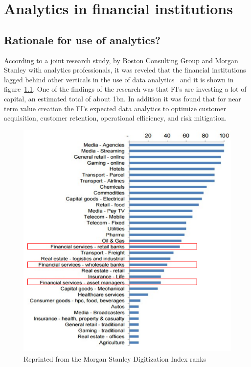 \setlength{\footskip}{8mm}

\chapter{Analytics in financial institutions}

\section{Rationale for use of analytics?}
According to a joint research study, by Boston Consulting Group and Morgan Stanley with analytics professionals, it was reveled that the financial institutions lagged behind other verticals in the use of data analytics~ and it is shown in figure~\ref{fig:da_digitization}. One of the findings of the research was that FI's are investing a lot of capital, an estimated total of about \textdollar1bn. In addition it was found that for near term value creation the FI's expected data analytics to optimize customer acquisition, customer retention, operational efficiency, and risk mitigation.
\newline
\newline
\begin{figure}[H]
	\includegraphics[width=13cm, height=12cm]{figures/DA_used_verticals.png}
	\caption{Reprinted from the Morgan Stanley Digitization Index ranks }
	\label{fig:da_digitization}
\end{figure}
\FloatBarrier

